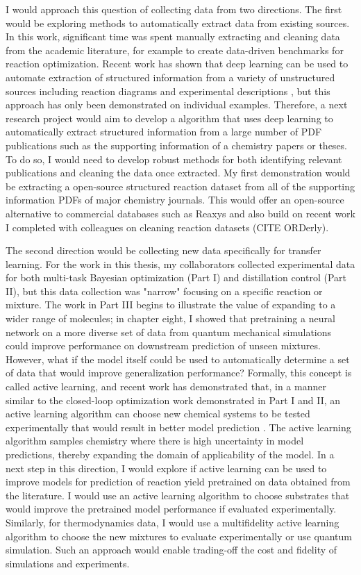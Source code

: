 I would approach this question of collecting data from two directions. The first would be exploring methods to automatically extract data from existing sources. In this work, significant time was spent manually extracting and cleaning data from the academic literature, for example to create data-driven benchmarks for reaction optimization. Recent work has shown that deep learning can be used to automate extraction of structured information from a variety of unstructured sources including reaction diagrams\cite{Qian2023} and experimental descriptions \cite{Guo2021}, but this approach has only been demonstrated on individual examples. Therefore, a next research project would aim to develop a algorithm that uses deep learning to  automatically extract structured information from a large number of PDF publications such as the supporting information of a chemistry papers or theses. To do so, I would need to develop robust methods for both identifying relevant publications and cleaning the data once extracted.  My first demonstration would be extracting a open-source structured reaction dataset from all of the supporting information PDFs of major chemistry journals. This would offer an open-source alternative to commercial databases such as Reaxys and also build on recent work I completed with colleagues on cleaning reaction datasets (CITE ORDerly).

The second direction would be collecting new data specifically for transfer learning. For the work in this thesis, my collaborators collected experimental data for both multi-task Bayesian optimization (Part I) and distillation control (Part II), but this data collection was "narrow" focusing on a specific reaction or mixture. The work in Part III begins to illustrate the value of expanding to a wider range of molecules; in chapter eight, I showed that pretraining a neural network on a more diverse set of data from quantum mechanical simulations could improve performance on downstream prediction of unseen mixtures. However, what if the model itself could be used to automatically determine a set of data that would  improve generalization performance? Formally, this concept is called active learning, and recent work has demonstrated that, in a manner similar to the closed-loop optimization work demonstrated in Part I and II, an active learning algorithm can choose new chemical systems to be tested experimentally that would result in better model prediction \cite{Angello2022}. The active learning algorithm samples chemistry where there is high uncertainty in model predictions, thereby expanding the domain of applicability of the model.  In a next step in this direction, I would explore if active learning can be used to improve models for prediction of reaction yield pretrained on data obtained from the literature. I would use an active learning algorithm to choose substrates that would improve the pretrained model performance if evaluated experimentally. Similarly, for thermodynamics data, I would use a multifidelity active learning algorithm to choose the new mixtures to evaluate experimentally or use quantum simulation. Such an approach would enable trading-off the cost and fidelity of simulations and experiments. 

